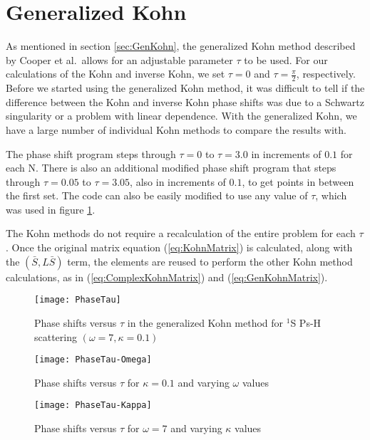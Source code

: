 \documentclass[Dissertation.tex]{subfiles}
\begin{document}
\section{Generalized Kohn}
\label{sec:CompGenKohn}
As mentioned in section \ref{sec:GenKohn}, the generalized Kohn method described by Cooper et al.\ allows for an adjustable parameter $\tau$ to be used. For our calculations of the Kohn and inverse Kohn, we set $\tau = 0$ and $\tau = \frac{\pi}{2}$, respectively. Before we started using the generalized Kohn method, it was difficult to tell if the difference between the Kohn and inverse Kohn phase shifts was due to a Schwartz singularity or a problem with linear dependence. With the generalized Kohn, we have a large number of individual Kohn methods to compare the results with.

The phase shift program steps through $\tau = 0$ to $\tau = 3.0$ in increments of $0.1$ for each N. There is also an additional modified phase shift program that steps through $\tau = 0.05$ to $\tau = 3.05$, also in increments of $0.1$, to get points in between the first set. The code can also be easily modified to use any value of $\tau$, which was used in figure \ref{fig:PhaseTau}.

The Kohn methods do not require a recalculation of the entire problem for each $\tau$. Once the original matrix equation (\ref{eq:KohnMatrix}) is calculated, along with the $(\bar{S},L\bar{S})$ term, the elements are reused to perform the other Kohn method calculations, as in (\ref{eq:ComplexKohnMatrix}) and (\ref{eq:GenKohnMatrix}).



\setlength{\abovecaptionskip}{0pt}   %

\begin{figure}[H]
	\centering
	\texttt{[image: PhaseTau]}
	\caption{Phase shifts versus $\tau$ in the generalized Kohn method for $^1$S Ps-H scattering $(\omega = 7, \kappa = 0.1)$}
	\label{fig:PhaseTau}
\end{figure}

\begin{figure}[H]
	\centering
	\texttt{[image: PhaseTau-Omega]}
	\caption{Phase shifts versus $\tau$ for $\kappa = 0.1$ and varying $\omega$ values}
	\label{fig:PhaseTau-Omega}
\end{figure}

\begin{figure}[H]
	\centering
	\texttt{[image: PhaseTau-Kappa]}
	\caption{Phase shifts versus $\tau$ for $\omega = 7$ and varying $\kappa$ values}
	\label{fig:PhaseTau-Kappa}
\end{figure}
\end{document}
